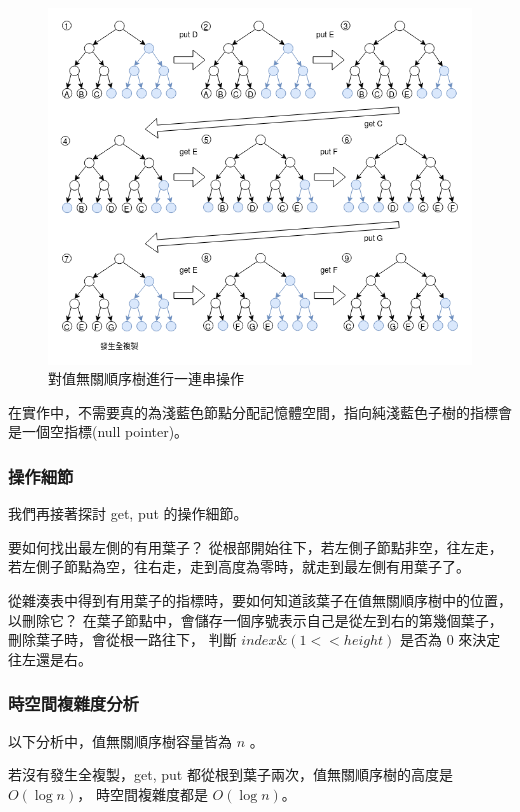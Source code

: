 \begin{figure}[h!]
\includegraphics[width=\textwidth]{順序樹連續變化}
\caption{對值無關順序樹進行一連串操作}
\end{figure}

在實作中，不需要真的為淺藍色節點分配記憶體空間，指向純淺藍色子樹的指標會是一個空指標(null pointer)。

\subsubsection{操作細節}

我們再接著探討 get, put 的操作細節。

要如何找出最左側的有用葉子？
從根部開始往下，若左側子節點非空，往左走，若左側子節點為空，往右走，走到高度為零時，就走到最左側有用葉子了。

從雜湊表中得到有用葉子的指標時，要如何知道該葉子在值無關順序樹中的位置，以刪除它？
在葉子節點中，會儲存一個序號表示自己是從左到右的第幾個葉子，刪除葉子時，會從根一路往下，
判斷 $index \& (1 << height)$ 是否為 0 來決定往左還是右。

\subsubsection{時空間複雜度分析}

以下分析中，值無關順序樹容量皆為 $n$ 。

若沒有發生全複製，get, put 都從根到葉子兩次，值無關順序樹的高度是 $O(\log n)$，
時空間複雜度都是 $O(\log n)$。

